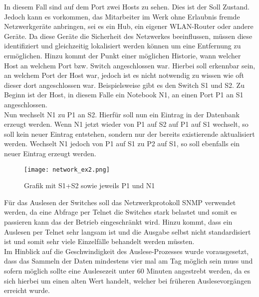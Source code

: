 In diesem Fall sind auf dem Port zwei Hosts zu sehen.
Dies ist der Soll Zustand. Jedoch kann es vorkommen, das Mitarbeiter im Werk ohne Erlaubnis fremde Netzwerkgeräte anbringen, sei es ein Hub, ein eigener WLAN-Router oder andere Geräte. Da diese Geräte die Sicherheit des Netzwerkes beeinflussen, müssen diese identifiziert und gleichzeitig lokalisiert werden können um eine Entfernung zu ermöglichen.
Hinzu kommt der Punkt einer möglichen Historie, wann welcher Host an welchem Port bzw. Switch angeschlossen war. Hierbei soll erkennbar sein, an welchem Port der Host war, jedoch ist es nicht notwendig zu wissen wie oft dieser dort angeschlossen war. Beispielsweise gibt es den Switch S1 und S2. Zu Beginn ist der Host, in diesem Falle ein Notebook N1, an einen Port P1 an S1 angeschlossen.\\
Nun wechselt N1 zu P1 an S2.
Hierfür soll nun ein Eintrag in der Datenbank erzeugt werden. Wenn N1 jetzt wieder von P1 auf S2 auf P1 auf S1 wechselt, so soll kein neuer Eintrag entstehen, sondern nur der bereits existierende aktualisiert werden. Wechselt N1 jedoch von P1 auf S1 zu P2 auf S1, so soll ebenfalls ein neuer Eintrag erzeugt werden.\\

\begin{figure}[H]
\centering
\texttt{[image: network\_ex2.png]}
\caption{Grafik mit S1+S2 sowie jeweils P1 und N1}
\label{fig:show_s1_s2_p1_n1}
\end{figure}


Für das Auslesen der Switches soll das Netzwerkprotokoll SNMP verwendet werden, da eine Abfrage per Telnet die Switches stark belastet und somit es passieren kann das der Betrieb eingeschränkt wird. Hinzu kommt, dass ein Auslesen per Telnet sehr langsam ist und die Ausgabe selbst nicht standardisiert ist und somit sehr viele Einzelfälle behandelt werden müssten.\\
Im Hinblick auf die Geschwindigkeit des Auslese-Prozesses wurde vorausgesetzt, dass das Sammeln der Daten mindestens vier mal am Tag möglich sein muss und sofern möglich sollte eine Auslesezeit unter 60 Minuten angestrebt werden, da es sich hierbei um einen alten Wert handelt, welcher bei früheren Auslesevorgängen erreicht wurde.\\

